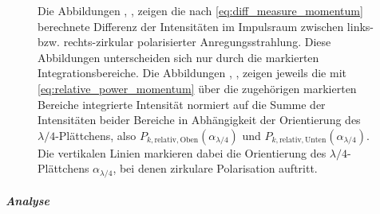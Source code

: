 \documentclass[titlepage,  ngerman]{article}
\begin{document}
\begin{figure}[h]
			\caption[Differenz- und Integrationsdaten PSHE Impulsraum]{Die Abbildungen , ,  zeigen die nach \eqref{eq:diff_measure_momentum} berechnete Differenz der Intensitäten im Impulsraum zwischen links- bzw. rechts-zirkular polarisierter Anregungsstrahlung. Diese Abbildungen unterscheiden sich nur durch die markierten Integrationsbereiche. Die Abbildungen , ,  zeigen jeweils die mit \eqref{eq:relative_power_momentum} über die zugehörigen markierten Bereiche integrierte Intensität normiert auf die Summe der Intensitäten beider Bereiche in Abhängigkeit der Orientierung des $\lambda/4$-Plättchens, also $P_{k, \mathrm{relativ}, \mathrm{Oben}}(\alpha_{\lambda/4})$ und $P_{k, \mathrm{relativ}, \mathrm{Unten}}(\alpha_{\lambda/4})$. Die vertikalen Linien markieren dabei die Orientierung des $\lambda/4$-Plättchens $\alpha_{\lambda/4}$, bei denen zirkulare Polarisation auftritt.}	
			\label{fig:spin_hall_measure}	
		\end{figure}
		\subparagraph{Analyse}
\end{document}
